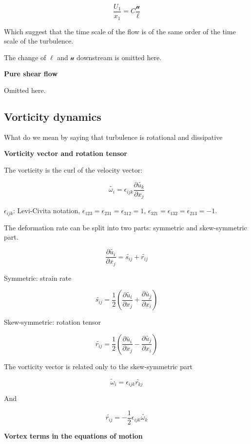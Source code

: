 \documentclass{article}
\begin{document}
\begin{equation*}
    \frac{U_1}{x_1}=C\frac{\mathcal{u}}{\ell}
\end{equation*}

Which suggest that the time scale of the flow is of the same order of the time scale of the turbulence.

The change of $\ell$ and $\mathcal{u}$ downstream is omitted here.

\textbf{Pure shear flow}

Omitted here.

\subsection{Vorticity dynamics}

What do we mean by saying that turbulence is rotational and dissipative

\textbf{Vorticity vector and rotation tensor}

The vorticity is the curl of the velocity vector:

\begin{equation*}
    \tilde{\omega_i}=\epsilon_{ijk}\frac{\partial \tilde{u_k}}{\partial x_j}
\end{equation*}

$\epsilon_{ijk}$: Levi-Civita notation, $\epsilon_{123}=\epsilon_{231}=\epsilon_{312}=1$, $\epsilon_{321}=\epsilon_{132}=\epsilon_{213}=-1$.

The deformation rate can be split into two parts: symmetric and skew-symmetric part.

\begin{equation*}
    \frac{\partial\tilde{u_i}}{\partial x_j}=\tilde{s_{ij}}+\tilde{r_{ij}}
\end{equation*}

Symmetric: strain rate

\begin{equation*}
    \tilde{s_{ij}}=\frac12\left(\frac{\partial \tilde{u_i}}{\partial x_j}+\frac{\partial \tilde{u_j}}{\partial x_i}\right)
\end{equation*}

Skew-symmetric: rotation tensor

\begin{equation*}
    \tilde{r_{ij}}=\frac12\left(\frac{\partial \tilde{u_i}}{\partial x_j}-\frac{\partial \tilde{u_j}}{\partial x_i}\right)
\end{equation*}

The vorticity vector is related only to the skew-symmetric part

\begin{equation*}
    \tilde\omega_i=\epsilon_{ijk}\tilde{r_{kj}}
\end{equation*}

And

\begin{equation*}
    \tilde{r_{ij}}=-\frac12\epsilon_{ijk}\tilde{\omega_k}
\end{equation*}

\textbf{Vortex terms in the equations of motion}



\ifx\allfiles\undefined         %
\end{document}
